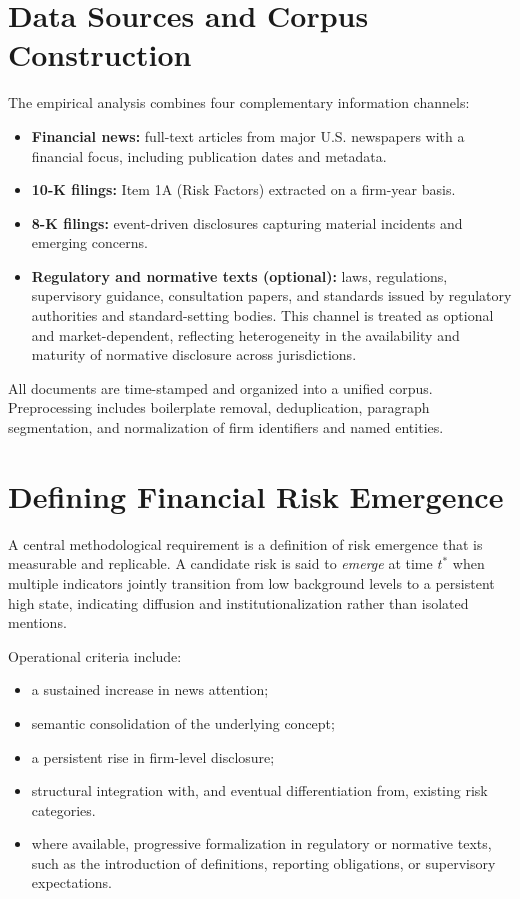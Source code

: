 \documentclass[11pt,a4paper]{article}
\begin{document}
\section{Data Sources and Corpus Construction}

The empirical analysis combines four complementary information channels:

\begin{itemize}
    \item \textbf{Financial news:} full-text articles from major U.S. newspapers with a financial focus, including publication dates and metadata.
    \item \textbf{10-K filings:} Item 1A (Risk Factors) extracted on a firm-year basis.
    \item \textbf{8-K filings:} event-driven disclosures capturing material incidents and emerging concerns.
    \item \textbf{Regulatory and normative texts (optional):} laws, regulations, supervisory guidance, consultation papers, and standards issued by regulatory authorities and standard-setting bodies. This channel is treated as optional and market-dependent, reflecting heterogeneity in the availability and maturity of normative disclosure across jurisdictions.
\end{itemize}

All documents are time-stamped and organized into a unified corpus. Preprocessing includes boilerplate removal, deduplication, paragraph segmentation, and normalization of firm identifiers and named entities.

\section{Defining Financial Risk Emergence}

A central methodological requirement is a definition of risk emergence that is measurable and replicable. A candidate risk is said to \emph{emerge} at time \( t^* \) when multiple indicators jointly transition from low background levels to a persistent high state, indicating diffusion and institutionalization rather than isolated mentions.

Operational criteria include:
\begin{itemize}
    \item a sustained increase in news attention;
    \item semantic consolidation of the underlying concept;
    \item a persistent rise in firm-level disclosure;
    \item structural integration with, and eventual differentiation from, existing risk categories.
\item where available, progressive formalization in regulatory or normative texts, such as the introduction of definitions, reporting obligations, or supervisory expectations.
\end{itemize}
\end{document}
